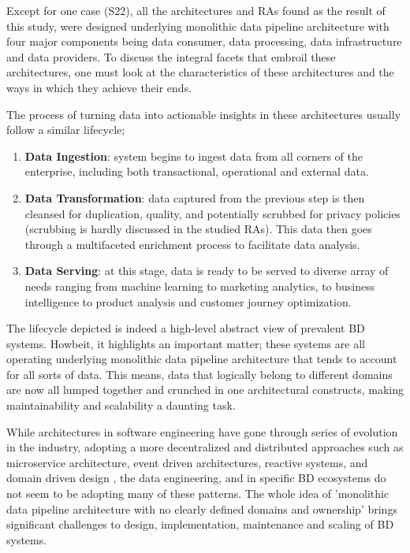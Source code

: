 \documentclass{ieeeaccess}
\begin{document}
Except for one case (S22), all the architectures and RAs found as the result of this study, were designed underlying monolithic data pipeline architecture with four major components being data consumer, data processing, data infrastructure and data providers. To discuss the integral facets that embroil these architectures, one must
look at the characteristics of these architectures and the ways in which they achieve their ends.

The process of turning data into actionable insights in these architectures usually follow a similar lifecycle;

\begin{enumerate}
    \item \textbf{Data Ingestion}: system begins to ingest data from all corners of the enterprise, including both transactional, operational and external data.
    \item \textbf{Data Transformation}: data captured from the previous step is then cleansed for duplication, quality, and potentially scrubbed for privacy policies (scrubbing is hardly discussed in the studied RAs). This data then goes through a multifaceted enrichment process to facilitate data analysis.
    \item \textbf{Data Serving}: at this stage, data is ready to be served to diverse array of needs ranging from machine learning to marketing analytics, to business intelligence to product analysis and customer journey optimization.
\end{enumerate}

The lifecycle depicted is indeed a high-level abstract view of prevalent BD systems. Howbeit, it highlights an important matter; these systems are all operating underlying monolithic data pipeline architecture that tends to account for all sorts of data. This means, data that logically belong to different domains are now all lumped together and crunched in one architectural constructs, making maintainability and scalability a daunting task.


While architectures in software engineering have gone through series of evolution in the industry, adopting a more decentralized and distributed approaches such as microservice architecture, event driven architectures, reactive systems, and domain driven design , the data engineering, and in specific BD ecosystems do not seem to be adopting many of these patterns. The whole idea of 'monolithic data
pipeline architecture with no clearly defined domains and ownership' brings significant challenges to design, implementation, maintenance and scaling of BD systems.
\end{document}

